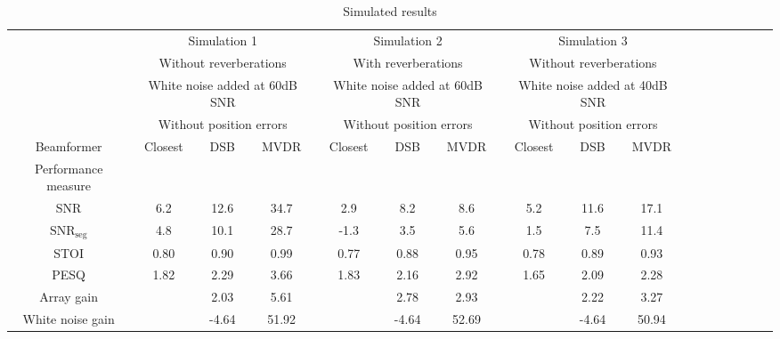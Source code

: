 \begin{sidewaystable}[h]
\centering

\caption{Simulated results}
\label{tab:simRes}
  \begin{adjustbox}{max width=\textwidth}
\begin{tabular}{|c|c|c|c|c|c|c|c|c|c|c|c|c|c|c|c|c|}
\hline

 & \multicolumn{3}{c|}{Simulation 1}					& \multicolumn{3}{c|}{Simulation 2} 					& \multicolumn{3}{c|}{Simulation 3} 					\\ 
 & \multicolumn{3}{c|}{Without reverberations}			& \multicolumn{3}{c|}{With reverberations} 				& \multicolumn{3}{c|}{Without reverberations} 			\\ 
 & \multicolumn{3}{c|}{White noise added at 60dB SNR}	& \multicolumn{3}{c|}{White noise added at 60dB SNR} 	& \multicolumn{3}{c|}{White noise added at 40dB SNR} 	\\
 & \multicolumn{3}{c|}{Without position errors}			& \multicolumn{3}{c|}{Without position errors}			& \multicolumn{3}{c|}{Without position errors} 			\\ \hline
 
Beamformer				& Closest  	& DSB 		& MVDR 	& Closest  	& DSB 	& MVDR 	& Closest  	& DSB 	& MVDR \\ \hline

Performance measure 	& 	 		& 	 		& 	 	& 	 	& 		& 		&     &   	 & \\

SNR 					& 6.2		& 12.6		& 34.7 	& 2.9 	& 8.2 	& 8.6 	& 5.2 & 11.6 & 17.1 \\

$\text{SNR}_\text{seg}$	& 4.8		& 10.1		& 28.7 	& -1.3 	& 3.5 	& 5.6 	& 1.5 & 7.5 & 11.4 \\

STOI    				& 0.80		& 0.90		& 0.99 	& 0.77 	& 0.88 	& 0.95 	& 0.78 & 0.89 & 0.93 \\

PESQ  					& 1.82		& 2.29		& 3.66 	& 1.83 	& 2.16 	& 2.92 	& 1.65 & 2.09 & 2.28 \\

Array gain  			& 			& 2.03		& 5.61 	&  		& 2.78 	& 2.93 	& 	 	& 2.22 & 3.27 \\

White noise gain 		& 			& -4.64		& 51.92 & 	 	& -4.64 & 52.69 & 	 	& -4.64 & 50.94  \\ \hline \hline





\end{tabular}
\end{adjustbox}
\end{sidewaystable}

